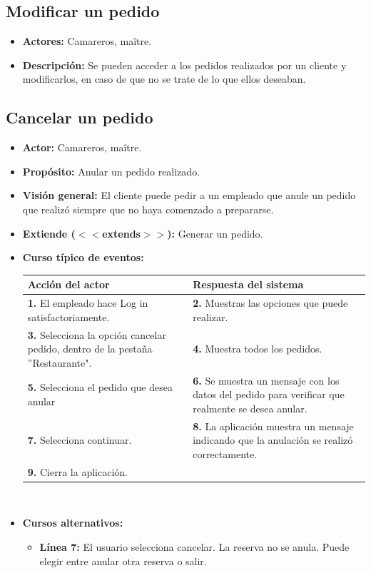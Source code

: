 \documentclass[spanish,a4paper,12pt]{report}	%
\begin{document}
		
	\subsection{Modificar un pedido}
			\begin{itemize}
			\item \textbf{Actores:} Camareros, maître.
			\item \textbf{Descripción:} Se pueden acceder a los pedidos realizados por un cliente y modificarlos, en caso de que no se trate de lo que ellos deseaban.
		\end {itemize}



		\subsection{Cancelar un pedido}
			\begin{itemize}
			\item \textbf{Actor:} Camareros, maître.
			\item \textbf{Propósito: } Anular un pedido realizado.
			\item \textbf{Visión general:} El cliente puede pedir a un empleado que anule un pedido que realizó siempre que no haya comenzado a prepararse.
			\item \textbf{Extiende ($<<$extends$>>$):} Generar un pedido.
			\item \textbf{Curso típico de eventos:} 	\\
				\begin{tabular}{|p{6cm}||p{6cm}|}
				\hline
				\textbf{Acción del actor} & \textbf{Respuesta del sistema} \\ \hline \hline
				\textbf{1.} El empleado hace Log in satisfactoriamente. & \textbf{2.} Muestras las opciones que puede realizar. \\ \hline
				\textbf{3.} Selecciona la opción cancelar pedido, dentro de la pestaña ''Restaurante". & \textbf{4.} Muestra todos los pedidos. \\ \hline
				\textbf{5.} Selecciona el pedido que desea anular	& \textbf{6.} Se muestra un mensaje con los datos del pedido para verificar que realmente se desea anular. \\ \hline
				\textbf{7.} Selecciona continuar.	& \textbf{8.} La aplicación muestra un mensaje indicando que la anulación se realizó correctamente. \\ \hline
				\textbf{9.} Cierra la aplicación. &  \\ \hline
			\end{tabular}
			\\
			\item \textbf{Cursos alternativos:} 
			\begin{itemize}
			\item  \textbf{Línea 7:} El usuario selecciona cancelar. La reserva no se anula. Puede elegir entre anular otra reserva o salir.
			\end {itemize}
		\end {itemize}
		
\end{document}

